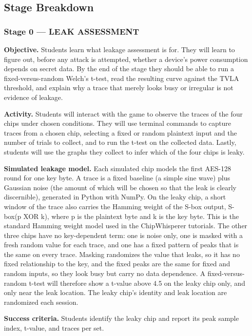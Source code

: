 \documentclass[11pt]{article}
\begin{document}
\subsection{Stage Breakdown}

\subsubsection*{Stage 0 --- LEAK ASSESSMENT}

\noindent\textbf{Objective.} Students learn what leakage assessment is for. They will learn to figure out, before any attack is attempted, whether a device's power consumption depends on secret data. By the end of the stage they should be able to run a fixed-versus-random Welch's t-test, read the resulting curve against the TVLA threshold, and explain why a trace that merely looks busy or irregular is not evidence of leakage.

\noindent\textbf{Activity.} Students will interact with the game to observe the traces of the four chips under chosen conditions. They will use terminal commands to capture traces from a chosen chip, selecting a fixed or random plaintext input and the number of trials to collect, and to run the t-test on the collected data. Lastly, students will use the graphs they collect to infer which of the four chips is leaky.

\noindent\textbf{Simulated leakage model.} Each simulated chip models the first AES-128 round for one key byte. A trace is a fixed baseline (a simple sine wave) plus Gaussian noise (the amount of which will be chosen so that the leak is clearly discernible), generated in Python with NumPy. On the leaky chip, a short window of the trace also carries the Hamming weight of the S-box output, S-box(p XOR k), where p is the plaintext byte and k is the key byte. This is the standard Hamming weight model used in the ChipWhisperer tutorials. The other three chips have no key-dependent term: one is noise only, one is masked with a fresh random value for each trace, and one has a fixed pattern of peaks that is the same on every trace. Masking randomizes the value that leaks, so it has no fixed relationship to the key, and the fixed peaks are the same for fixed and random inputs, so they look busy but carry no data dependence. A fixed-versus-random t-test will therefore show a t-value above 4.5 on the leaky chip only, and only near the leak location. The leaky chip’s identity and leak location are randomized each session.

\noindent\textbf{Success criteria.} Students identify the leaky chip and report its peak sample index, t-value, and traces per set.
\end{document}
